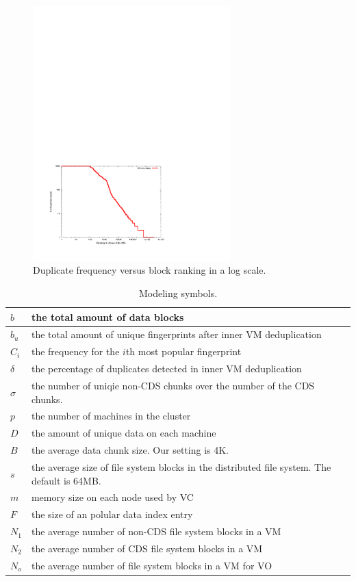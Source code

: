 \begin{figure}
\centering
 \includegraphics[width=3in]{log-log-disk.pdf}
\caption{Duplicate frequency versus  block ranking in a log scale.}
\label{fig:Datazipf}
\end{figure}

\begin{table}[ht]
\centering
\begin{tabular}{|p{1.25cm}|p{6.5cm}|}
\hline
$b$ &  the total amount of data blocks\\ 
\hline
$b_u$ &  the total amount of unique fingerprints after inner VM  deduplication\\
\hline
$C_i$ &  the frequency for the $i$th most popular fingerprint\\
\hline
$\delta$ &  the percentage of duplicates detected in inner VM deduplication\\
\hline
$\sigma$ &  the number of uniqie non-CDS chunks over  the number of the CDS chunks.\\
\hline
$p$ & the number of machines in the cluster\\
\hline
$D$ & the amount of unique data on each machine\\
\hline
$B$ & the average data chunk size. Our setting is  4K.\\
\hline
$s$ & the average size of file system blocks in the distributed file system. The default is  64MB.\\
\hline
$m$ & memory size on each node used by VC\\ 
\hline
$F$ & the size of an polular data index entry\\
$N_1$ & the average number  of non-CDS file system blocks  in a VM\\
$N_2$ & the average number  of CDS file system blocks  in a VM\\
$N_o$ & the average number  of file system blocks  in a VM for VO\\
\hline
\end{tabular}
\caption{Modeling  symbols.}
\label{tab:symbol}
\end{table}


